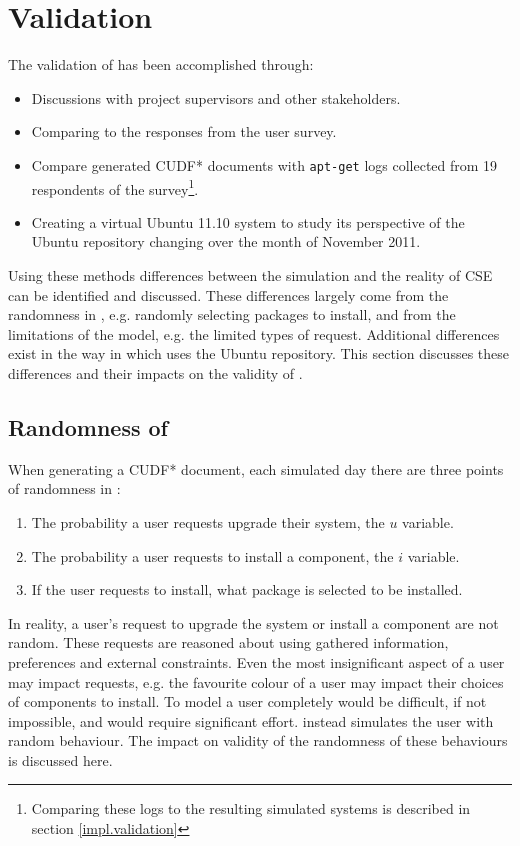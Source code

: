 \section{\usermodel Validation}
\label{sim.modelvalidation}
The validation of \usermodel has been accomplished through:
\begin{itemize}
  \item Discussions with project supervisors and other stakeholders.
  \item Comparing \usermodel to the responses from the user survey.
  \item Compare generated CUDF* documents with \texttt{apt-get} logs collected from 19 
  respondents of the survey\footnote{Comparing these logs to the resulting simulated systems is described in section \ref{impl.validation}}.
  \item Creating a virtual Ubuntu 11.10 system to study its perspective of the Ubuntu repository changing over the month of November 2011.
\end{itemize}

Using these methods differences between the simulation and the reality of CSE can be identified and discussed.
These differences largely come from the randomness in \usermodel, e.g. randomly selecting packages to install,
and from the limitations of the model, e.g. the limited types of request.
Additional differences exist in the way in which \usermodel uses the Ubuntu repository.
This section discusses these differences and their impacts on the validity of \usermodel.

\subsection{Randomness of \usermodel}
\label{sim.randomness}
When generating a CUDF* document, each simulated day there are three points of randomness in \usermodel:
\begin{enumerate}
  \item The probability a user requests upgrade their system, the $u$ variable.
  \item The probability a user requests to install a component, the $i$ variable.
  \item If the user requests to install, what package is selected to be installed.
\end{enumerate}
In reality, a user's request to upgrade the system or install a component are not random.
These requests are reasoned about using gathered information, preferences and external constraints.
Even the most insignificant aspect of a user may impact requests, e.g. the favourite colour of a user may impact their choices of components to install.
To model a user completely would be difficult, if not impossible, and would require significant effort.
\usermodel instead simulates the user with random behaviour.
The impact on validity of the randomness of these behaviours is discussed here.

